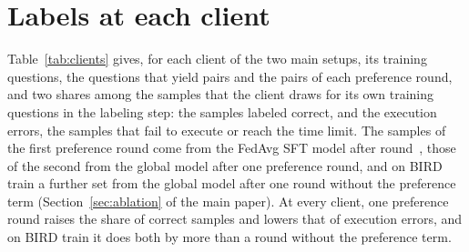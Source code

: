 \section{Labels at each client}\label{sup:clients}

Table~\ref{tab:clients} gives, for each client of the two main setups,
its training questions, the questions that yield pairs and the pairs of
each preference round, and two shares among the samples that the client
draws for its own training questions in the labeling step: the samples
labeled correct, and the execution errors, the samples that fail to
execute or reach the time limit. The samples of the first preference
round come from the FedAvg SFT model after round~,
those of the second from the global model after one preference round,
and on BIRD train a further set from the global model after one round
without the preference term (Section~\ref{sec:ablation} of the main
paper). At every client, one preference round raises the share of
correct samples and lowers that of execution errors, and on BIRD train
it does both by more than a round without the preference term.

\begin{table}[!ht]
\caption{Each client on its own training questions: the questions that
yield pairs and the pairs of each preference round, and the shares (\%)
of correct samples and of execution errors among the samples of the
labeling step, drawn from the FedAvg SFT model after
round~ (Start), from the global model after one
preference round (After) and, on BIRD train, from the global model after
one round without the preference term (No pref.).}\label{tab:clients}
\footnotesize

\end{table}
